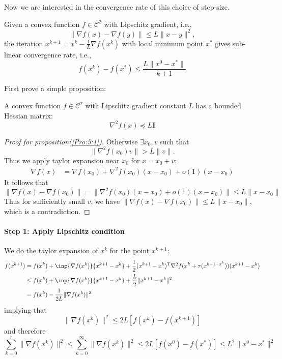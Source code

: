 Now we are interested in the convergence rate of this choice of step-size.
\begin{theorem}
Given a convex function $f\in\mathcal{C}^2$ with Lipschitz gradient, i.e.,
\[
\|\nabla f(x)-\nabla f(y)\|\le L\|x-y\|^2,
\]
the iteration $x^{k+1} = x^k-\frac{1}{L}\nabla f(x^k)$ with local minimum point $x^*$ gives \mbox{sub-linear} convergence rate, i.e.,
\[
f(x^k) - f(x^*)\le\frac{L\|x^0-x^*\|}{k+1}
\]
\end{theorem}
First prove a simple proposition:
\begin{proposition}\label{Pro:5:1}
A convex function $f\in\mathcal{C}^2$ with Lipschitz gradient constant $L$ has a bounded Hessian matrix:
\[
\nabla^2f(x)\preceq L\bm I
\]
\end{proposition}
\begin{proof}[Proof for proposition(\ref{Pro:5:1})]
Otherwise $\exists x_0,v$ such that
\[
\|\nabla^2f(x_0)v\|>L\|v\|.
\]
Thus we apply taylor expansion near $x_0$ for $x=x_0+v$:
\begin{align*}
\nabla f(x)&=\nabla f(x_0)+\nabla^2f(x_0)(x-x_0)+o(1)(x-x_0)
\end{align*}
It follows that 
\[
\|\nabla f(x)-\nabla f(x_0)\|= \|\nabla^2f(x_0)(x-x_0)+o(1)(x-x_0)\|\le L\|x-x_0\|
\]
Thus for sufficiently small $v$, we have $\|\nabla f(x)-\nabla f(x_0)\|\le L\|x-x_0\|$, which is a contradiction.
\end{proof}
\paragraph{Step 1: Apply Lipschitz condition}
We do the taylor expansion of $x^{k}$ for the point $x^{k+1}$:
\begin{align*}
f(x^{k+1})&=f(x^k)+\inp{\nabla f(x^k)}{x^{k+1} - x^k}+\frac{1}{2}(x^{k+1} - x^k)\trans\nabla^2 f(x^k+\tau (x^{k+1 - x^k}))(x^{k+1} - x^k)\\
&\le f(x^k)+\inp{\nabla f(x^k)}{x^{k+1} - x^k}+\frac{L}{2}\|x^{k+1} - x^k\|^2\\
&=f(x^k)-\frac{1}{2L}\|\nabla f(x^k)\|^2
\end{align*}
implying that
\[
\|\nabla f(x^k)\|^2\le2L[f(x^k) - f(x^{k+1})]
\]
and therefore 
\begin{equation}\label{Eq:5:5}
\sum_{k=0}^r\|\nabla f(x^k)\|^2\le
\sum_{k=0}^\infty \|\nabla f(x^k)\|^2\le
 2L[f(x^0) - f(x^{*})]
\le L^2\|x^0-x^*\|^2
\end{equation}
